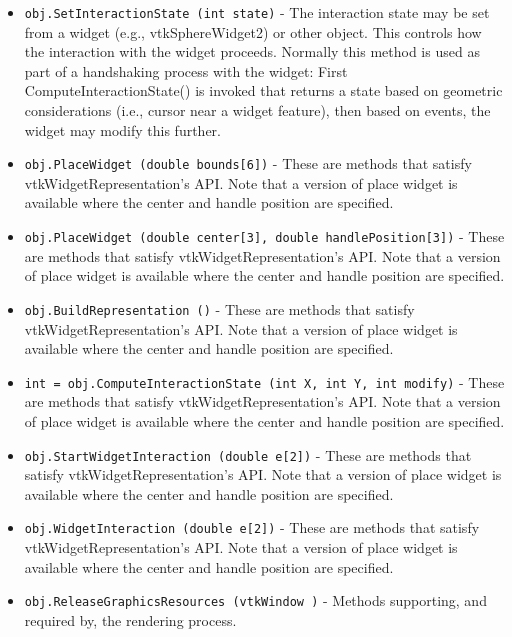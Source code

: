 \begin{itemize}
\item  \verb|obj.SetInteractionState (int state)| -  The interaction state may be set from a widget (e.g., vtkSphereWidget2) or
 other object. This controls how the interaction with the widget
 proceeds. Normally this method is used as part of a handshaking
 process with the widget: First ComputeInteractionState() is invoked that
 returns a state based on geometric considerations (i.e., cursor near a
 widget feature), then based on events, the widget may modify this
 further.

\item  \verb|obj.PlaceWidget (double bounds[6])| -  These are methods that satisfy vtkWidgetRepresentation's API. Note that a 
 version of place widget is available where the center and handle position
 are specified.

\item  \verb|obj.PlaceWidget (double center[3], double handlePosition[3])| -  These are methods that satisfy vtkWidgetRepresentation's API. Note that a 
 version of place widget is available where the center and handle position
 are specified.

\item  \verb|obj.BuildRepresentation ()| -  These are methods that satisfy vtkWidgetRepresentation's API. Note that a 
 version of place widget is available where the center and handle position
 are specified.

\item  \verb|int = obj.ComputeInteractionState (int X, int Y, int modify)| -  These are methods that satisfy vtkWidgetRepresentation's API. Note that a 
 version of place widget is available where the center and handle position
 are specified.

\item  \verb|obj.StartWidgetInteraction (double e[2])| -  These are methods that satisfy vtkWidgetRepresentation's API. Note that a 
 version of place widget is available where the center and handle position
 are specified.

\item  \verb|obj.WidgetInteraction (double e[2])| -  These are methods that satisfy vtkWidgetRepresentation's API. Note that a 
 version of place widget is available where the center and handle position
 are specified.

\item  \verb|obj.ReleaseGraphicsResources (vtkWindow )| -  Methods supporting, and required by, the rendering process.


\end{itemize}

